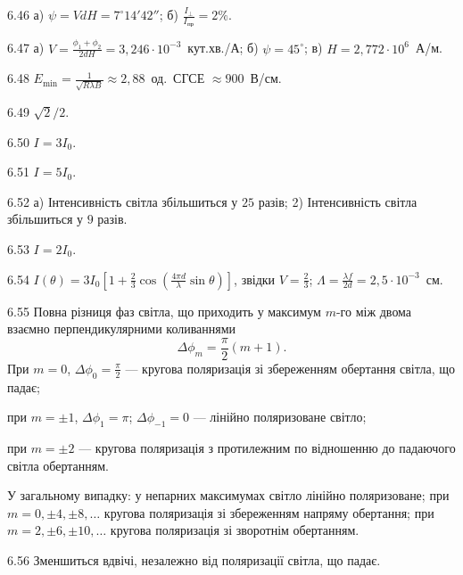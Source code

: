 \begin{Solution}{6.{46}}
        а) $ \psi = VdH = 7^\circ14'42'' $; б) $ \frac{I_\perp}{I_\text{пр}} = 2\% $.
    
\end{Solution}
\begin{Solution}{6.{47}}
        а) $ V = \frac{\phi_1 + \phi_2}{2dH} = 3,246 \cdot 10^{-3}$~кут.хв./А; б) $ \psi = 45^\circ $; в) $ H = 2,772\cdot10^6 $~А/м.
    
\end{Solution}
\begin{Solution}{6.{48}}
        $ E_{\min} = \frac{1}{\sqrt{R\lambda B}} \approx 2,88 $~од.~СГСЕ $ \approx 900 $~В/см.
    
\end{Solution}
\begin{Solution}{6.{49}}
        $ \sqrt{2}/2 $.
    
\end{Solution}
\begin{Solution}{6.{50}}
        $ I = 3I_0 $.
    
\end{Solution}
\begin{Solution}{6.{51}}
        $ I = 5I_0 $.
    
\end{Solution}
\begin{Solution}{6.{52}}
        а) Інтенсивність світла збільшиться у $ 25 $ разів; 2) Інтенсивність світла збільшиться у $ 9 $ разів.
    
\end{Solution}
\begin{Solution}{6.{53}}
        $ I = 2I_0 $.
    
\end{Solution}
\begin{Solution}{6.{54}}
        $ I(\theta) = 3I_0 \left[1 + \frac{2}{3} \cos \left(\frac{4\pi d}{\lambda} \sin\theta\right)\right]  $, звідки $ V = \frac{2}{3} $; $ \Lambda = \frac{\lambda f}{2 d} = 2,5 \cdot 10^{-3} $~см.
    
\end{Solution}
\begin{Solution}{6.{55}}
        Повна різниця фаз світла, що приходить у максимум $ m $-го між двома взаємно
        перпендикулярними коливаннями
        \begin{equation*}
            \Delta \phi_m = \frac{\pi}{2}(m + 1) .
        \end{equation*}
        При $ m = 0 $, $\Delta \phi_0 = \frac{\pi}{2} $ --- кругова поляризація зі збереженням обертання світла, що падає;

        при $ m = \pm1 $, $\Delta \phi_1 = \pi $; $ \Delta \phi_{-1} = 0 $ ---  лінійно поляризоване світло;

        при $  m = \pm2 $ --- кругова поляризація з протилежним по відношенню до падаючого світла обертанням.

        У загальному випадку: у непарних максимумах світло лінійно поляризоване; при $  m = 0, \pm4, \pm8, \ldots $ кругова поляризація зі збереженням напряму обертання; при $ m = 2, \pm6, \pm10, \ldots $ кругова поляризація зі зворотнім обертанням.
    
\end{Solution}
\begin{Solution}{6.{56}}
        Зменшиться вдвічі, незалежно від поляризації світла, що падає.
    
\end{Solution}
